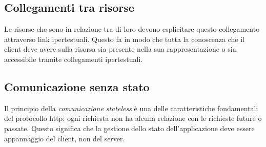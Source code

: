 \subsection{Collegamenti tra risorse}
Le risorse che sono in relazione tra di loro devono esplicitare questo collegamento attraverso link ipertestuali. Questo fa in modo che tutta la conoscenza che il client deve avere sulla risorsa sia presente nella sua rappresentazione o sia accessibile tramite collegamenti ipertestuali.

\subsection{Comunicazione senza stato}
Il principio della \textit{comunicazione stateless} è una delle caratteristiche fondamentali del protocollo \gls{http}\glsfirstoccur{}: ogni richiesta non ha alcuna relazione con le richieste future o passate. Questo significa che la gestione dello stato dell'applicazione deve essere appannaggio del client, non del server.

